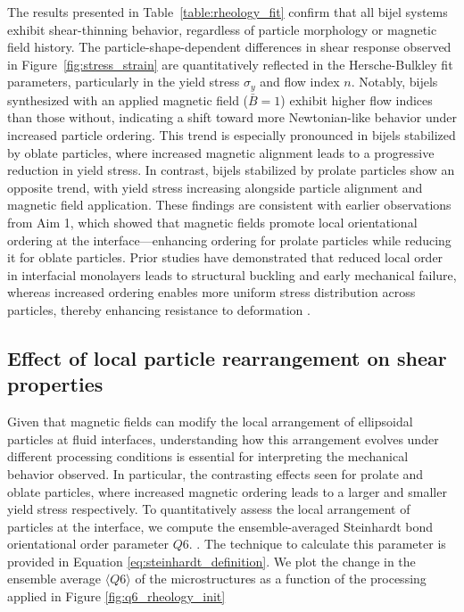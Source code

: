 The results presented in Table~\ref{table:rheology_fit} confirm that all bijel systems exhibit shear-thinning behavior, regardless of particle morphology or 
magnetic field history. The particle-shape-dependent differences in shear response observed in Figure~\ref{fig:stress_strain} are quantitatively reflected in 
the Hersche-Bulkley fit parameters, particularly in the yield stress $\sigma_y$ and flow index $n$. Notably, bijels synthesized with an applied magnetic field 
($\bar{B} = 1$) exhibit higher flow indices than those without, indicating a shift toward more Newtonian-like behavior under increased particle ordering. This 
trend is especially pronounced in bijels stabilized by oblate particles, where increased magnetic alignment leads to a progressive reduction in yield stress. 
In contrast, bijels stabilized by prolate particles show an opposite trend, with yield stress increasing alongside particle alignment and magnetic field 
application. These findings are consistent with earlier observations from Aim 1, which showed that magnetic fields promote local orientational ordering at the 
interface—enhancing ordering for prolate particles while reducing it for oblate particles. Prior studies have demonstrated that reduced local order in 
interfacial monolayers leads to structural buckling and early mechanical failure, whereas increased ordering enables more uniform stress distribution 
across particles, thereby enhancing resistance to deformation \cite{prakash_buckling_2024}.

\subsection{Effect of local particle rearrangement on shear properties}

Given that magnetic fields can modify the local arrangement of ellipsoidal particles at fluid interfaces, understanding how this arrangement evolves under 
different processing conditions is essential for interpreting the mechanical 
behavior observed. In particular, the contrasting effects seen for prolate and oblate particles, where increased magnetic ordering leads to a larger
and smaller yield stress respectively. To quantitatively assess the local arrangement of particles at the interface, we compute the ensemble-averaged 
Steinhardt bond orientational order parameter $Q6$. 
\cite{steinhardt_bond-orientational_1983, lechner_accurate_2008, mickel_shortcomings_2013}. The technique to calculate this parameter is provided in
Equation \ref{eq:steinhardt_definition}. We plot the change in the ensemble average
$\langle Q6 \rangle$ of the microstructures as a function of the processing applied in Figure \ref{fig:q6_rheology_init}

